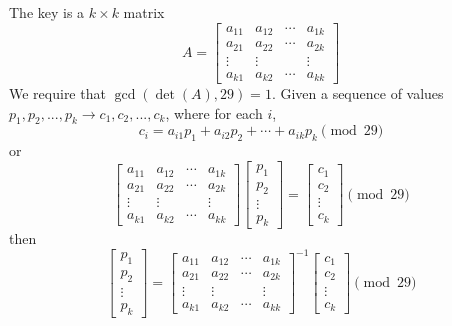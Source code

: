 \documentclass[11pt]{article}
\theoremstyle{definition}\newtheorem{definition}{Definition}
\theoremstyle{definition}\newtheorem{example}{Example}
\theoremstyle{definition}\newtheorem{samplecode}{Sample Code}
\begin{document}
The key is a $k \times k$ matrix
\begin{equation*}
    A = \begin{bmatrix}
        a_{11} & a_{12} & \cdots & a_{1k} \\
        a_{21} & a_{22} & \cdots & a_{2k} \\
        \vdots & \vdots & & \vdots \\
        a_{k1} & a_{k2} & \cdots & a_{kk}
    \end{bmatrix}
\end{equation*}
We require that $\gcd(\det(A), 29) = 1$. Given a sequence of values $p_1, p_2,..., p_k \to c_1, c_2,..., c_k$, where for each $i$,
\begin{equation*}
    c_i = a_{i1}p_1 + a_{i2}p_2 + \cdots + a_{ik}p_k \pmod {29}
\end{equation*}
or
\begin{equation*}
    \begin{bmatrix}
        a_{11} & a_{12} & \cdots & a_{1k} \\
        a_{21} & a_{22} & \cdots & a_{2k} \\
        \vdots & \vdots & & \vdots \\
        a_{k1} & a_{k2} & \cdots & a_{kk}
    \end{bmatrix}\begin{bmatrix} p_1 \\ p_2 \\ \vdots \\ p_k \end{bmatrix} = \begin{bmatrix} c_1 \\ c_2 \\ \vdots \\ c_k \end{bmatrix} \pmod {29}
\end{equation*}
then
\begin{equation*}
    \begin{bmatrix} p_1 \\ p_2 \\ \vdots \\ p_k \end{bmatrix} = \begin{bmatrix}
        a_{11} & a_{12} & \cdots & a_{1k} \\
        a_{21} & a_{22} & \cdots & a_{2k} \\
        \vdots & \vdots & & \vdots \\
        a_{k1} & a_{k2} & \cdots & a_{kk}
    \end{bmatrix}^{-1}\begin{bmatrix} c_1 \\ c_2 \\ \vdots \\ c_k \end{bmatrix} \pmod {29}
\end{equation*}
\end{document}

